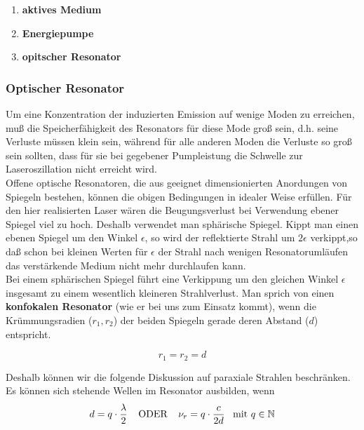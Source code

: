 \documentclass[a4paper,oneside]{article}
\begin{document}
\begin{enumerate}
\item \textbf{aktives Medium}\\
\item \textbf{Energiepumpe}\\
\item \textbf{opitscher Resonator} 
\end{enumerate}

\subsubsection{Optischer Resonator}

Um eine Konzentration der induzierten Emission auf wenige Moden zu erreichen, muß die Speicherfähigkeit des Resonators für diese Mode groß sein, d.h. seine Verluste müssen klein sein, während für alle anderen Moden die Verluste so groß sein sollten, dass für sie bei gegebener Pumpleistung die Schwelle zur Laseroszillation nicht erreicht wird.\\
Offene optische Resonatoren, die aus geeignet dimensionierten Anordungen von Spiegeln bestehen, können die obigen Bedingungen in idealer Weise erfüllen. Für den hier realisierten Laser wären die Beugungsverlust bei Verwendung ebener Spiegel viel zu hoch. Deshalb verwendet man sphärische Spiegel. Kippt man einen ebenen Spiegel um den Winkel $\epsilon$, so wird der reflektierte Strahl um $2\epsilon$ verkippt,so daß schon bei kleinen Werten für $\epsilon$ der Strahl nach wenigen Resonatorumläufen das verstärkende Medium nicht mehr durchlaufen kann.\\
Bei einem sphärischen Spiegel führt eine Verkippung um den gleichen Winkel $\epsilon$ insgesamt zu einem wesentlich kleineren Strahlverlust. Man sprich von einen \textbf{konfokalen Resonator} (wie er bei uns zum Einsatz kommt), wenn die Krümmungsradien ($r_1, r_2$) der beiden Spiegeln gerade deren Abstand ($d$) entspricht.

\begin{equation*}
r_1=r_2=d
\end{equation*}

Deshalb können wir die folgende Diskussion auf paraxiale Strahlen beschränken. Es können sich stehende Wellen im Resonator ausbilden, wenn 
\begin{equation}
 d=q\cdot \frac{\lambda}{2} \text{\;\;\;\;ODER\;\;\;\;} \nu_r=q\cdot \frac{c}{2d} \text{\;\;\;mit }q\in \mathbb{N} 
 \label{bediengung_fuer_stehende_welle}
\end{equation}
\end{document}
